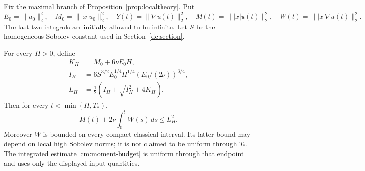 Fix the maximal branch of Proposition~\ref{prop:localtheory}. Put
\[
 E_0=\|u_0\|_2^2,\quad M_0=\||x|u_0\|_2^2,\quad
 Y(t)=\|\nabla u(t)\|_2^2,\quad
 M(t)=\||x|u(t)\|_2^2,\quad W(t)=\||x|\nabla u(t)\|_2^2.
\]
The last two integrals are initially allowed to be infinite. Let $S$ be
the homogeneous Sobolev constant used in Section~\ref{dc:section}.

\begin{proposition}
\label{cm:moment}
For every $H>0$, define
\begin{align*}
 K_H&=M_0+6\nu E_0H,\\
 I_H&=6S^{3/2}E_0^{1/4}H^{1/4}(E_0/(2\nu))^{3/4},\\
 L_H&=\tfrac12\left(I_H+\sqrt{I_H^2+4K_H}\right).
\end{align*}
Then for every $t<\min(H,T_*)$,
\begin{equation}\label{cm:moment-budget}
 M(t)+2\nu\int_0^tW(s)\,ds\le L_H^2.
\end{equation}
Moreover $W$ is bounded on every compact classical interval. Its latter
bound may depend on local high Sobolev norms; it is not claimed to be
uniform through $T_*$. The integrated estimate
\eqref{cm:moment-budget} is uniform through that endpoint and uses only
the displayed input quantities.
\end{proposition}
